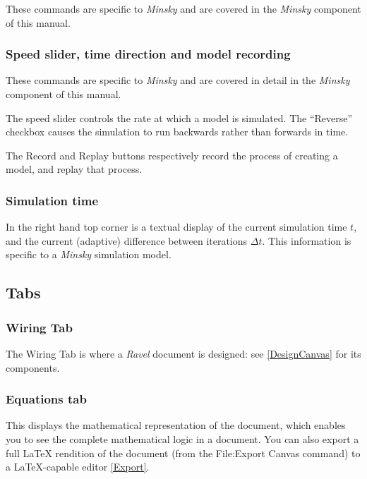 These commands are specific to \emph{Minsky} and are covered in the
\emph{Minsky} component of this manual.

\subsubsection{Speed slider, time direction and model recording}

These commands are specific to \emph{Minsky} and are covered in detail
in the \emph{Minsky} component of this manual.

The speed slider controls the rate at which a model is simulated.
The ``Reverse'' checkbox causes the simulation to run backwards
rather than forwards in time. 

The Record and Replay buttons respectively record the process of creating
a model, and replay that process. 

\subsubsection{Simulation time}

In the right hand top corner is a textual display of the current simulation
time $t$, and the current (adaptive) difference between iterations
$\Delta t$. This information is specific to a \emph{Minsky} simulation
model.

\subsection{Tabs}

\subsubsection{Wiring Tab}

\label{tabs:wiring}

The Wiring Tab is where a \emph{Ravel} document is designed: see \ref{DesignCanvas}
for its components.

\subsubsection{Equations tab}

\label{tabs:Equations}

This displays the mathematical representation of the document, which
enables you to see the complete mathematical logic in a document.
You can also export a full \LaTeX{} rendition of the document (from the
File:Export Canvas command) to a \LaTeX-capable editor \ref{Export}.

